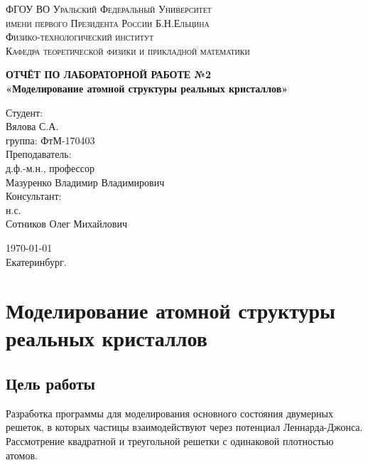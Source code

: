 \documentclass[14pt,a4paper,report]{ncc}
\begin{document}
\def\contentsname{Содержание}

\begin{titlepage}
\begin{center}
\textsc{ФГОУ ВО Уральский Федеральный Университет \\ имени первого Президента России Б.Н.Ельцина\\[5mm]
Физико-технологический институт\\[2mm]
Кафедра теоретической физики и прикладной математики}

\vfill

\textbf{ОТЧЁТ ПО ЛАБОРАТОРНОЙ РАБОТЕ №2\\[3mm]
«Моделирование атомной структуры реальных кристаллов»\\[6mm]
}
\end{center}

\hfill
\begin{minipage}{.5\textwidth}
Студент:\\[2mm] 
Вялова С.А.\\
группа: ФтМ-170403 \\[5mm]

Преподаватель:\\[2mm] 
д.ф.-м.н., профессор\\
Мазуренко Владимир Владимирович\\[5mm]

Консультант:\\[2mm] 
н.с.\\
Сотников Олег Михайлович\\

\end{minipage}%
\vfill
\begin{center}
\today  \\
 Екатеринбург.
\end{center}
\end{titlepage}

\tableofcontents
\newpage
\chapter{Моделирование атомной структуры реальных кристаллов}
\section{Цель работы}


Разработка программы для моделирования основного состояния двумерных решеток, в которых частицы взаимодействуют через потенциал Леннарда-Джонса. Рассмотрение квадратной и треугольной решетки с одинаковой плотностью атомов.
\
\end{document}
